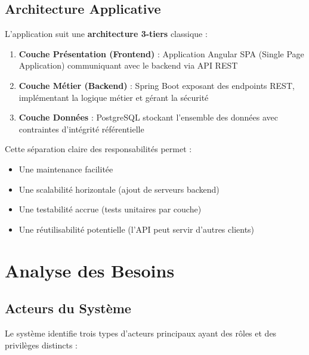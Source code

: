 \documentclass[12pt,a4paper]{report}
\begin{document}
\subsection{Architecture Applicative}

L'application suit une \textbf{architecture 3-tiers} classique :

\begin{enumerate}[itemsep=0.5em]
    \item \textbf{Couche Présentation (Frontend)} : Application Angular SPA (Single Page Application) communiquant avec le backend via API REST
    \item \textbf{Couche Métier (Backend)} : Spring Boot exposant des endpoints REST, implémentant la logique métier et gérant la sécurité
    \item \textbf{Couche Données} : PostgreSQL stockant l'ensemble des données avec contraintes d'intégrité référentielle
\end{enumerate}

Cette séparation claire des responsabilités permet :
\begin{itemize}
    \item Une maintenance facilitée
    \item Une scalabilité horizontale (ajout de serveurs backend)
    \item Une testabilité accrue (tests unitaires par couche)
    \item Une réutilisabilité potentielle (l'API peut servir d'autres clients)
\end{itemize}

\section{Analyse des Besoins}

\subsection{Acteurs du Système}

Le système identifie trois types d'acteurs principaux ayant des rôles et des privilèges distincts :
\end{document}
